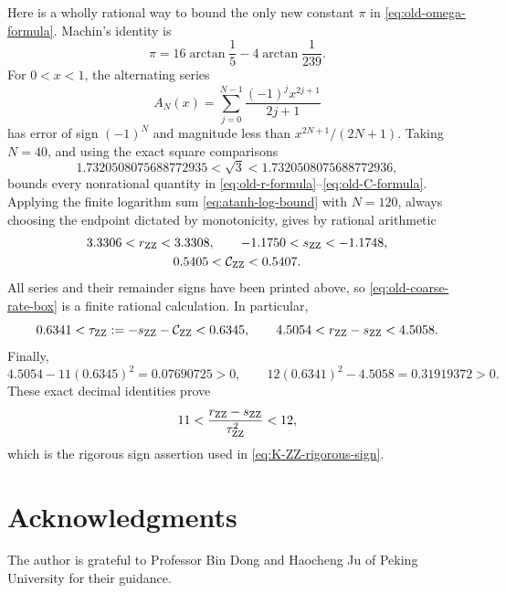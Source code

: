 \documentclass[11pt,reqno,letterpaper]{amsart}
\numberwithin{equation}{section}
\theoremstyle{definition}
\theoremstyle{remark}
\begin{document}
Here is a wholly rational way to bound the only new constant \(\pi\)
in \eqref{eq:old-omega-formula}.  Machin's identity is
\[
 \pi=16\arctan\frac15-4\arctan\frac1{239}.
\]
For \(0<x<1\), the alternating series
\[
 A_N(x)=\sum_{j=0}^{N-1}\frac{(-1)^jx^{2j+1}}{2j+1}
\]
has error of sign \((-1)^N\) and magnitude less than
\(x^{2N+1}/(2N+1)\).  Taking \(N=40\), and using the exact square
comparisons
\[
 1.7320508075688772935<\sqrt3<
 1.7320508075688772936,
\]
bounds every nonrational quantity in
\eqref{eq:old-r-formula}--\eqref{eq:old-C-formula}.  Applying the finite
logarithm sum \eqref{eq:atanh-log-bound} with \(N=120\), always choosing
the endpoint dictated by monotonicity, gives by rational arithmetic
\begin{equation}\label{eq:old-coarse-rate-box}
 \begin{gathered}
 3.3306<r_{\rm ZZ}<3.3308,\qquad
 -1.1750<s_{\rm ZZ}<-1.1748,\\
 0.5405<\mathcal C_{\rm ZZ}<0.5407.
 \end{gathered}
\end{equation}
All series and their remainder signs have been printed above, so
\eqref{eq:old-coarse-rate-box} is a finite rational calculation.
In particular,
\[
 0.6341<\tau_{\rm ZZ}:=-s_{\rm ZZ}-\mathcal C_{\rm ZZ}<0.6345,
\qquad
 4.5054<r_{\rm ZZ}-s_{\rm ZZ}<4.5058.
\]
Finally,
\[
 4.5054-11(0.6345)^2=0.07690725>0,
\qquad
 12(0.6341)^2-4.5058=0.31919372>0.
\]
These exact decimal identities prove
\[
 11<
 \frac{r_{\rm ZZ}-s_{\rm ZZ}}{\tau_{\rm ZZ}^2}
 <12,
\]
which is the rigorous sign assertion used in
\eqref{eq:K-ZZ-rigorous-sign}.


\section*{Acknowledgments}
The author is grateful to Professor Bin Dong and Haocheng Ju of Peking University
for their guidance.



\end{document}
